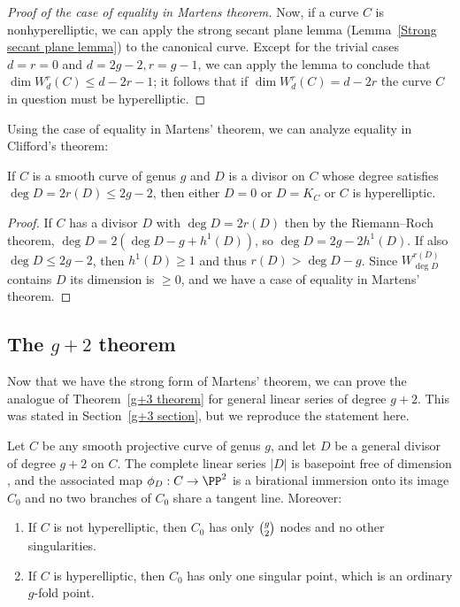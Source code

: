 \begin{proof}[Proof of the case of equality in Martens theorem]
 Now, if a curve $C$ is nonhyperelliptic, we can apply the
strong secant plane lemma
%
(Lemma~\ref{Strong secant plane lemma})
 to the
canonical curve.
%
Except for the trivial cases $d=r=0$
 and $d=2g-2, r=g-1$,
 we can apply
the lemma
to conclude that
 $\dim W^r_d(C) \leq d-2r-1$; it follows that if
$\dim W^r_d(C)
 = d-2r$ the curve $C$ in question must be hyperelliptic.
\unif
\end{proof}

Using the case of equality in Martens' theorem, we can analyze equality in
Clifford's theorem:
%

\begin{corollary}\label{equality in Clifford from Martens}
If $C$ is a smooth curve of genus $g$ and $D$
is
a divisor on $C$
whose degree satisfies $\deg D = 2r(D)\le 2g-2$,
then either $D =0$ or $D=K_C$ or $C$
is hyperelliptic.
\unif
\end{corollary}

\begin{proof}
If $C$ has a divisor $D$ with $\deg D =2 r(D)$ then by the Riemann--Roch
theorem,  $\deg D  = 2(\deg D-g+h^1(D))$,
so $\deg D = 2g-2h^1(D)$. If also $\deg D\leq 2g-2$, then $h^1(D) \geq 1$
and thus $r(D) >\deg D-g$. Since $W^{r(D)}_{\deg D}$ contains $D$
its dimension
is $\geq 0$, and we have a case of equality in Martens' theorem.
\end{proof}


\subsection*{The $g+2$ theorem}

Now that we have the strong form of Martens' theorem, we can prove the
analogue of Theorem~\ref{g+3 theorem} for general linear series of degree
$g+2$. This was stated in Section~\ref{g+3 section}, but
we
reproduce
the statement here.
%

\begin{theorem}\label{needed for nodes}
Let $C$ be any smooth projective curve of genus $g$, and let $D$ be a
general divisor of degree $g+2$ on $C$.
The complete linear series $|D|$ is basepoint free of dimension \2,
and the associated map $\phi_D: C\to \PP^2$
 is a
birational
immersion
%
onto its image $C_0$
and no two branches of $C_0$ share a tangent line.
Moreover:

\begin{enumerate}
\item If $C$ is not hyperelliptic, then $C_0$ has only $\tbinom{g}{2}$
nodes and no other singularities.
\item If $C$ is hyperelliptic,
then
$C_0$ has only one singular point,
  which is an ordinary $g$-fold point.
\end{enumerate}
\end{theorem}

